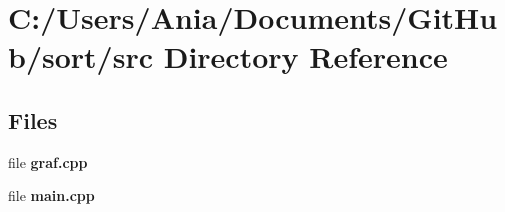 \section{C\-:/\-Users/\-Ania/\-Documents/\-Git\-Hub/sort/src Directory Reference}
\label{dir_c5ffe59ce5ca5fcc9842e0e935fd26ee}
\subsection*{Files}
\begin{DoxyCompactItemize}
\item 
file {\bf graf.\-cpp}
\item 
file {\bf main.\-cpp}
\end{DoxyCompactItemize}
